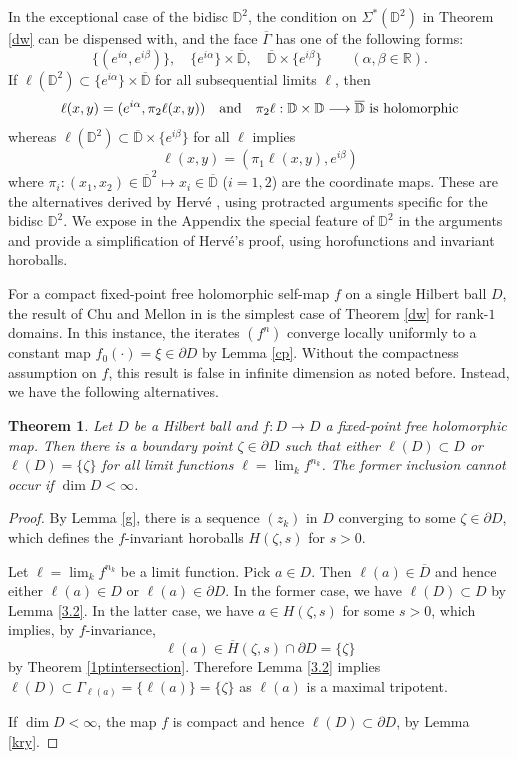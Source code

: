 \documentclass[12pt, twoside]{article}
\newtheorem{theorem}{Theorem}[section]
\theoremstyle{definition}
\numberwithin{equation}{section}
\begin{document}
In the exceptional case of the bidisc  $\mathbb{D}^2$,
the condition on $\Sigma^*(\mathbb{D}^2)$ in Theorem \ref{dw} can be
dispensed with, and
 the  face $\overline\Gamma$ has one of the following forms:
$$\{(e^{i\alpha}, e^{i\beta})\}, \quad \{e^{i\alpha}\}\times \overline{ \mathbb{D}}, \quad \overline{\mathbb{D}}\times \{e^{i\beta}\}
\qquad (\alpha, \beta \in \mathbb{R}).$$
If $\ell(\mathbb{D}^2) \subset \{e^{i\alpha}\}\times \overline{\mathbb{D}}$ for all
subsequential limits $\ell$, then
$$\ell(x,y) = (e^{i\alpha}, \pi_2 \ell(x,y))\quad {\rm and}\quad  \pi_2 \ell:\mathbb{D}\times \mathbb{D}
\longrightarrow \overline{\mathbb{D}} ~\mbox{is holomorphic}$$
whereas $\ell(\mathbb{D}^2) \subset \overline{\mathbb{D}}\times \{e^{i\beta}\}$ for all
$\ell$ implies
$$\ell(x,y) = (\pi_1 \ell(x,y), e^{i\beta})$$
where $\pi_i : (x_1,x_2) \in \overline{\mathbb{D}}^2\mapsto x_i\in \overline{\mathbb{D}}$ ($i=1,2$)
are the coordinate maps.
These are the alternatives derived by Herv\'e \cite[Th\'eor\`eme 4]{h1},
using protracted arguments specific for the bidisc  $\mathbb{D}^2$.
We expose  in the Appendix the special feature of $\mathbb{D}^2$ in the arguments and provide
a simplification of Herv\'e's proof, using horofunctions and invariant horoballs.

For a compact fixed-point free holomorphic self-map $f$ on a single Hilbert ball $D$,
the result of Chu and Mellon in \cite[Theorem]{cm}
 is the simplest case of  Theorem \ref{dw} for  rank-$1$  domains.
 In this instance, the iterates $(f^n)$ converge locally uniformly to a
constant map $f_0(\cdot) = \xi\in \partial D$ by Lemma \ref{cp}. Without the compactness assumption on $f$,
this result is false in infinite dimension as noted before. Instead, we have the following alternatives.

\begin{theorem}\label{single} Let $D$ be a Hilbert ball and $f: D \longrightarrow D$ a fixed-point free holomorphic map.
Then there is a boundary point $\zeta \in \partial D$ such that either $\ell(D) \subset D$ or $\ell(D) =\{\zeta\}$
for all limit functions $\ell=\lim_k f^{n_k}$. The former inclusion cannot occur if $\dim D <\infty$.
\end{theorem}
\begin{proof} By Lemma \ref{g}, there is a sequence $(z_k)$ in $D$ converging to
some $\zeta \in \partial D$, which defines the $f$-invariant  horoballs
$H(\zeta,s)$ for $s>0$.

Let $\ell = \lim_k f^{n_k}$ be a limit function. Pick  $a\in D$. Then $\ell(a) \in \overline D$
and hence either $\ell(a) \in D$ or $\ell (a) \in \partial D$. In the former case,
we have $\ell(D) \subset D$ by Lemma \ref{3.2}. In the latter case, we have $a\in H(\zeta,s)$ for some $s>0$,
which implies, by $f$-invariance,
$$\ell(a) \in \overline H(\zeta,s) \cap \partial D = \{\zeta\}$$
 by Theorem \ref{1ptintersection}.
Therefore Lemma \ref{3.2} implies $\ell(D) \subset \Gamma_{\ell(a)} =\{\ell(a)\}= \{\zeta\}$ as $\ell(a)$
is a maximal tripotent.

If $\dim D<\infty$, the map $f$ is compact and hence $\ell(D) \subset \partial D$, by Lemma \ref{kry}.
\end{proof}
\end{document}
